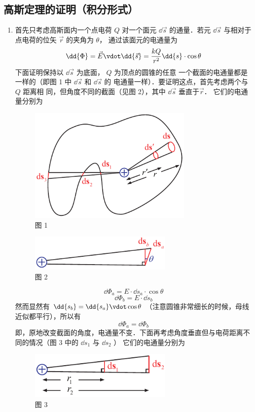 \subsection{高斯定理的证明（积分形式）}
\begin{enumerate}
\item 首先只考虑高斯面内一个点电荷 $Q$ 对一个面元 $\dd{\vec s}$ 的通量．若元 $\dd{\vec s}$ 与相对于点电荷的位矢 $\vec r$ 的夹角为 $\theta$， 通过该面元的电通量为
\begin{equation}
\dd{\Phi} = \vec E \vdot \dd{\vec s} = \frac{kQ}{r^2} \dd{s} \cdot \cos \theta 
\end{equation} 
下面证明保持以 $\dd{\vec s}$ 为底面， $Q$ 为顶点的圆锥的任意
一个截面的电通量都是一样的（即图 1 中 $\dd{\vec s}$ 和 $\dd{\vec s}$ 的
电通量一样）．要证明这点，首先考虑两个与 $Q$ 距离相
同，但角度不同的截面（见图 2），其中 $\dd{\vec s}$ 垂直于$\vec r$． 它们的电通量分别为
\begin{figure}[ht]
\centering
\includegraphics[width=8cm]{./figures/EGauss1.pdf}
\caption{图 1}
\end{figure}
\begin{figure}[ht]
\centering
\includegraphics[width=7cm]{./figures/EGauss2.pdf}
\caption{图 2}
\end{figure}

\begin{equation}
\dd{\Phi_a} = E \cdot \dd{s_a} \cdot \cos \theta 
\end{equation} 
\begin{equation}
\dd{\Phi_b} = E \cdot \dd{s_b}
\end{equation} 
然而显然有 $\dd{s_b} = \dd{s_a} \vdot \cos \theta $ （注意圆锥非常细长的时候，母线近似都平行），所以有
\begin{equation}
\dd{\Phi_a} = \dd{\Phi_b}
\end{equation} 
即，原地改变截面的角度，电通量不变．下面再考虑角度垂直但与电荷距离不同的情况（图 3 中的 $\dd{s_1}$ 与 $\dd{s_2}$ ） 它们的电通量分别为
\begin{figure}[ht]
\centering
\includegraphics[width=7cm]{./figures/EGauss3.pdf}
\caption{图 3}
\end{figure}


\end{enumerate}
